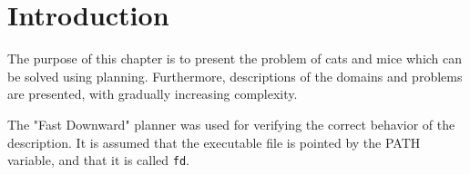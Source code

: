 \section{Introduction}

The purpose of this chapter is to present the problem of cats and mice which can be solved using planning. Furthermore, descriptions of the domains and problems are presented, with gradually increasing complexity.

The "Fast Downward" planner was used for verifying the correct behavior of the description. It is assumed that the executable file is pointed by the PATH variable, and that it is called \verb|fd|.
